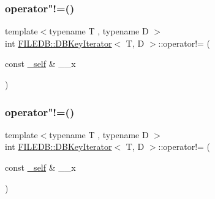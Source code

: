 \subsubsection{\texorpdfstring{operator"!=()}{operator!=()}\hspace{0.1cm}{\footnotesize\ttfamily [1/2]}}
{\footnotesize\ttfamily template$<$typename T , typename D $>$ \\
int \mbox{\hyperlink{classFILEDB_1_1DBKeyIterator}{F\+I\+L\+E\+D\+B\+::\+D\+B\+Key\+Iterator}}$<$ T, D $>$\+::operator!= (\begin{DoxyParamCaption}\item[{const \mbox{\hyperlink{classFILEDB_1_1DBKeyIterator_aaf7773c7a848ec6e04bc738dd794ace1}{\+\_\+self}} \&}]{\+\_\+\+\_\+x }\end{DoxyParamCaption})\hspace{0.3cm}{\ttfamily [inline]}}

\mbox{\label{classFILEDB_1_1DBKeyIterator_aa92d51bde395e8c546d9cbe1c65ef5e1}} 
\subsubsection{\texorpdfstring{operator"!=()}{operator!=()}\hspace{0.1cm}{\footnotesize\ttfamily [2/2]}}
{\footnotesize\ttfamily template$<$typename T , typename D $>$ \\
int \mbox{\hyperlink{classFILEDB_1_1DBKeyIterator}{F\+I\+L\+E\+D\+B\+::\+D\+B\+Key\+Iterator}}$<$ T, D $>$\+::operator!= (\begin{DoxyParamCaption}\item[{const \mbox{\hyperlink{classFILEDB_1_1DBKeyIterator_aaf7773c7a848ec6e04bc738dd794ace1}{\+\_\+self}} \&}]{\+\_\+\+\_\+x }\end{DoxyParamCaption})\hspace{0.3cm}{\ttfamily [inline]}}

\mbox{\label{classFILEDB_1_1DBKeyIterator_ab3cfba3f2b19b6eb74ff614c62195ab4}} 
